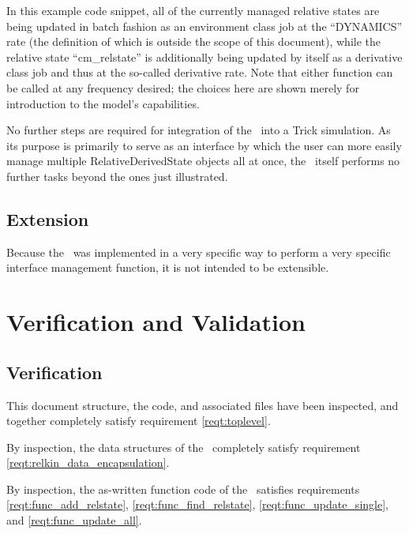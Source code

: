 In this example code snippet, all of the currently managed relative states are
being updated in batch fashion as an environment class job at the ``DYNAMICS''
rate (the definition of which is outside the scope of this document), while
the relative state ``cm\_relstate'' is additionally being updated by itself
as a derivative class job and thus at the so-called derivative rate. Note that
either function can be called at any frequency desired; the choices here are
shown merely for introduction to the model's capabilities.

No further steps are required for integration of the \relkinDesc\ into a Trick
simulation.  As its purpose is primarily to serve as an interface by which the
user can more easily manage multiple RelativeDerivedState objects all at once,
the \relkinDesc\ itself performs no further tasks beyond the ones just
illustrated.


\section{Extension}

Because the \relkinDesc\ was implemented in a very specific way to perform a
very specific interface management function, it is not intended to be extensible.



\chapter{Verification and Validation}\label{ch:ivv}

\section{Verification}

\label{inspect:TLI}
This document structure, the code, and associated files have been inspected,
and together completely satisfy requirement \ref{reqt:toplevel}.

\label{inspect:data_reqts}
By inspection, the data structures of the \relkinDesc\ completely satisfy
requirement \ref{reqt:relkin_data_encapsulation}.

\label{inspect:func_reqts}
By inspection, the as-written function code of the \relkinDesc\
satisfies requirements \ref{reqt:func_add_relstate},
\ref{reqt:func_find_relstate}, \ref{reqt:func_update_single}, and
\ref{reqt:func_update_all}.


